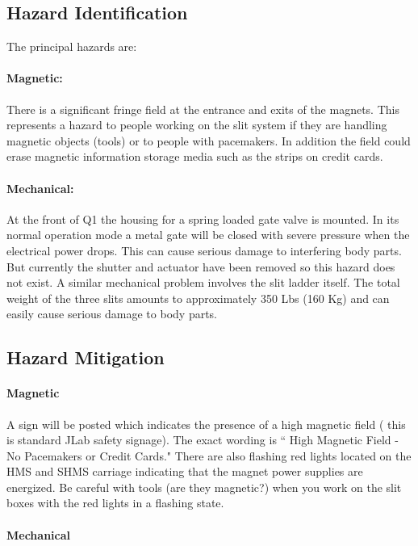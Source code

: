    
\subsection{Hazard Identification}

The principal hazards are:
\paragraph{Magnetic:} There is a significant fringe field at
the entrance and exits of the magnets. This represents a hazard
to people working on the slit system if they are handling magnetic
objects (tools) or to people with pacemakers. In addition the field could erase magnetic
information storage media such as the strips on credit cards.
\paragraph{Mechanical:} At the front of Q1 the housing for a spring loaded gate valve is
mounted. In its normal operation mode a metal gate will be closed with
severe pressure when the electrical power drops. This can cause serious
damage to interfering body parts.  But currently the shutter and
actuator have been removed so this hazard does not exist.  
A similar mechanical problem involves the slit ladder itself. The total weight of
the three slits amounts to approximately 350 Lbs (160 Kg) and can easily
cause serious damage to body parts.

\subsection{Hazard Mitigation}

\paragraph{Magnetic}

A sign will be posted which indicates the presence of a high magnetic
field ( this is standard JLab safety signage). The exact wording is
`` High Magnetic Field - No Pacemakers or Credit Cards." There are also
flashing red lights located on the HMS and SHMS carriage indicating that the
magnet power supplies are energized. Be careful with tools (are they magnetic?)
when you work on the slit boxes with the red lights in a flashing state.

\paragraph{Mechanical}

